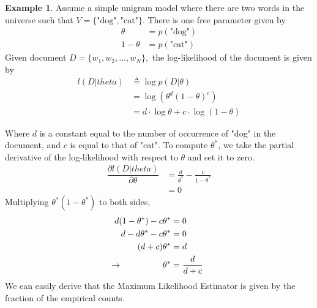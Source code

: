\documentclass[justified, marginals=justified]{tufte-handout}
\theoremstyle{definition}
\newtheorem{exmp}{Example}
\begin{document}
\begin{exmp}\label{dog-cat-example}
	Assume a simple unigram model where there are two words in the universe such that $V = \{\text{"dog"}, \text{"cat"}\}$. There is one free parameter given by
	\begin{align*}
	\theta &= p(\text{"dog"}) \\
	1-\theta &= p(\text{"cat"})
	\end{align*}
	Given document $D=\{w_1, w_2, ..., w_N\},$ the log-likelihood of the document is given by
	\begin{align*}
	l(D|theta) &\triangleq  \log p(D|\theta) \\
	&= \log( \theta^{d}(1-\theta)^{c} ) \\
	&= d\cdot \log \theta + c\cdot \log (1-\theta)
	\end{align*}
	
	Where $d$ is a constant equal to the number of occurrence of "dog" in the document, and $c$ is equal to that of "cat". To compute $\theta^*$, we take the partial derivative of the log-likelihood with respect to $\theta$ and set it to zero. 
	\begin{align*}
	\dfrac{\partial l(D|theta)}{\partial \theta}&=\frac{d}{\theta^*}-\frac{c}{1-\theta^*} \\
	&= 0
	\end{align*}
	Multiplying $\theta^*(1-\theta^*)$ to both sides,
	\begin{align*}
	d(1-\theta^*) - c\theta^* &= 0 \\
	d - d\theta^* -c\theta^* &= 0 \\
	(d+c)\theta^* &= d \\
	\llap{$\rightarrow$\hspace{50pt}} \theta^* &= \frac{d}{d+c}
	\end{align*}
	We can easily derive that the Maximum Likelihood Estimator is given by the fraction of the empirical counts.
	
\end{exmp}
\end{document}
